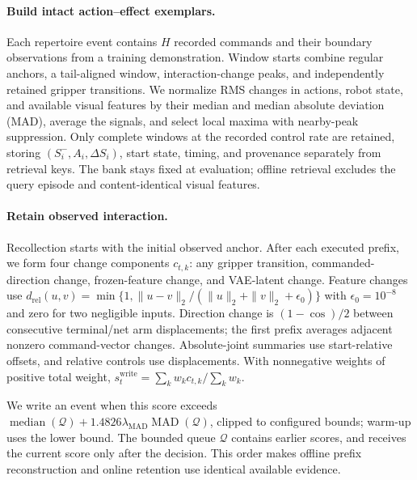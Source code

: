 \paragraph{Build intact action--effect exemplars.}
Each repertoire event contains $H$ recorded commands and their boundary observations from a training demonstration.
Window starts combine regular anchors, a tail-aligned window, interaction-change peaks, and independently retained gripper transitions.
We normalize RMS changes in actions, robot state, and available visual features by their median and median absolute deviation (MAD), average the signals, and select local maxima with nearby-peak suppression.
Only complete windows at the recorded control rate are retained, storing $(S_i^-,A_i,\Delta S_i)$, start state, timing, and provenance separately from retrieval keys.
The bank stays fixed at evaluation; offline retrieval excludes the query episode and content-identical visual features.

\paragraph{Retain observed interaction.}
Recollection starts with the initial observed anchor.
After each executed prefix, we form four change components $c_{t,k}$: any gripper transition, commanded-direction change, frozen-feature change, and VAE-latent change.
Feature changes use
$d_{\mathrm{rel}}(u,v)=\min\{1,\|u-v\|_2/(\|u\|_2+\|v\|_2+\epsilon_0)\}$ with $\epsilon_0=10^{-8}$ and zero for two negligible inputs.
Direction change is $(1-\cos)/2$ between consecutive terminal/net arm displacements; the first prefix averages adjacent nonzero command-vector changes.
Absolute-joint summaries use start-relative offsets, and relative controls use displacements.
With nonnegative weights of positive total weight, $s_t^{\mathrm{write}}=\sum_kw_kc_{t,k}/\sum_kw_k$.

We write an event when this score exceeds
$\operatorname{median}(\mathcal Q)+1.4826\lambda_{\mathrm{MAD}}\operatorname{MAD}(\mathcal Q)$,
clipped to configured bounds; warm-up uses the lower bound.
The bounded queue $\mathcal Q$ contains earlier scores, and receives the current score only after the decision.
This order makes offline prefix reconstruction and online retention use identical available evidence.

